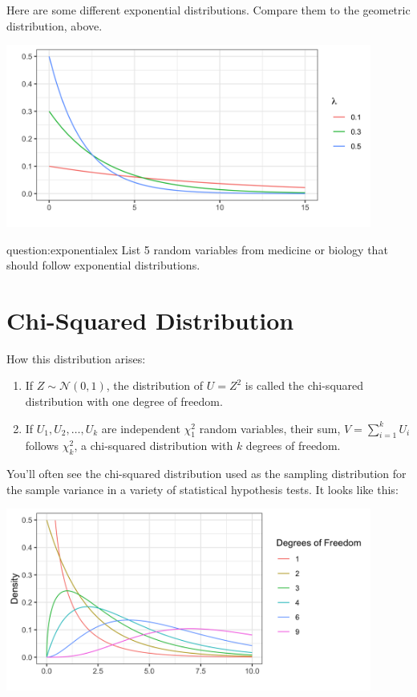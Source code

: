 Here are some different exponential distributions. Compare them to the geometric distribution, above.
\begin{center}
\includegraphics[width=0.9\textwidth]{img/l01-figure5-exponential-lambda-change.png}
\end{center}

\begin{question}{question:exponentialex}
List 5 random variables from medicine or biology that should follow exponential distributions.
\end{question}


\section{Chi-Squared Distribution \label{sect:chisqdist}}

How this distribution arises:
\begin{enumerate}
\item If $Z \sim \mathcal{N}(0, 1)$, the distribution of $U = Z^2$ is called the chi-squared distribution with one degree of freedom.
\item If $U_1, U_2, \dots, U_k$ are independent $\chi_1^2$ random variables, their sum,
$ V = \sum_{i=1}^k U_i $
follows $\chi_k^2$, a chi-squared distribution with $k$ degrees of freedom.
\end{enumerate}

You'll often see the chi-squared distribution used as the sampling distribution for the sample variance in a variety of statistical hypothesis tests. It looks like this:
\begin{center}
\includegraphics[width=0.9\textwidth]{img/hyp-example-chisq-distribution.png}
\end{center}

